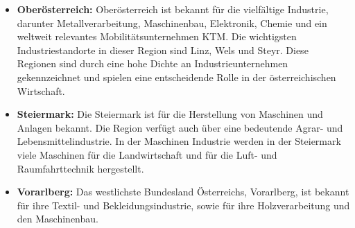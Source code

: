 \begin{itemize}
	\item \textbf{Oberösterreich:} Oberösterreich ist bekannt für die vielfältige Industrie, darunter Metallverarbeitung, Maschinenbau, Elektronik, Chemie und ein weltweit relevantes Mobilitätsunternehmen KTM. Die wichtigsten Industriestandorte in dieser Region sind Linz, Wels und Steyr. Diese Regionen sind durch eine hohe Dichte an Industrieunternehmen gekennzeichnet und spielen eine entscheidende Rolle in der österreichischen Wirtschaft.
	\item \textbf{Steiermark:} Die Steiermark ist für die Herstellung von Maschinen und Anlagen bekannt. Die Region verfügt auch über eine bedeutende Agrar- und Lebensmittelindustrie. In der Maschinen Industrie werden in der Steiermark viele Maschinen für die Landwirtschaft und für die Luft- und Raumfahrttechnik hergestellt.
	\item \textbf{Vorarlberg:} Das westlichste Bundesland Österreichs, Vorarlberg, ist bekannt für ihre Textil- und Bekleidungsindustrie, sowie für ihre Holzverarbeitung und den Maschinenbau.
\end{itemize}
